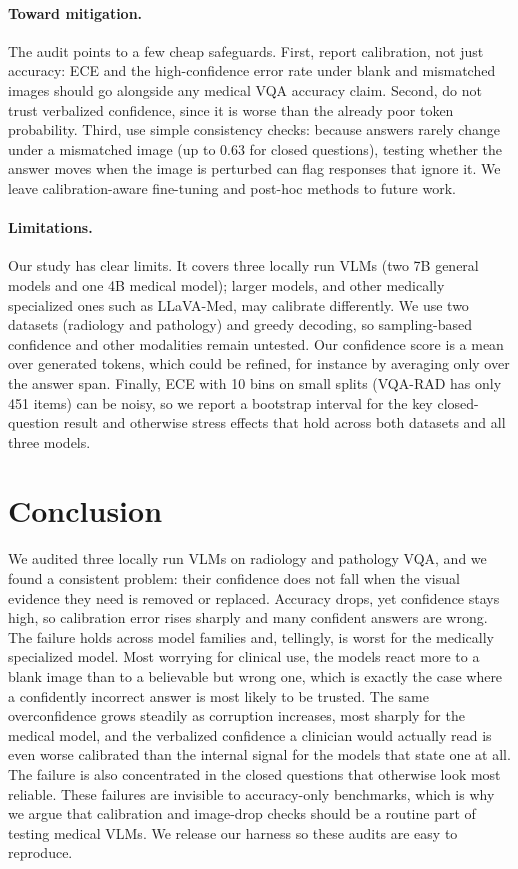 \documentclass{article}
\begin{document}
\paragraph{Toward mitigation.} The audit points to a few cheap safeguards. First,
report calibration, not just accuracy: ECE and the high-confidence error rate under
blank and mismatched images should go alongside any medical VQA accuracy claim.
Second, do not trust verbalized confidence, since it is worse than the already poor
token probability. Third, use simple consistency checks: because answers rarely
change under a mismatched image (up to $0.63$ for closed questions), testing whether
the answer moves when the image is perturbed can flag responses that ignore it. We
leave calibration-aware fine-tuning and post-hoc methods to future work.
\paragraph{Limitations.} Our study has clear limits. It covers three locally run VLMs (two
7B general models and one 4B medical model); larger models, and other
medically specialized ones such as LLaVA-Med, may calibrate differently. We use two
datasets (radiology
and pathology) and greedy decoding, so sampling-based confidence and other
modalities remain untested. Our confidence score is a mean over generated tokens,
which could be refined, for instance by averaging only over the answer span. Finally,
ECE with 10 bins on small splits (VQA-RAD has only 451
items) can be noisy, so we report a bootstrap interval for the key closed-question
result and otherwise stress effects that hold across both datasets and all three
models.

\section{Conclusion}
We audited three locally run VLMs on radiology and pathology VQA, and we found a
consistent problem: their confidence does not fall when the visual evidence they
need is removed or replaced. Accuracy drops, yet confidence stays high, so
calibration error rises sharply and many confident answers are wrong. The failure
holds across model families and, tellingly, is worst for the medically specialized
model. Most worrying for clinical use, the models react more to a blank image than
to a believable but wrong one, which is exactly the case where a confidently
incorrect answer is most likely to be trusted. The same overconfidence grows
steadily as corruption increases, most sharply for the medical model, and the
verbalized confidence a clinician would actually read is even worse calibrated than
the internal signal for the models that state one at all. The failure is also
concentrated in the closed questions that otherwise look most reliable. These failures are invisible to accuracy-only benchmarks, which is
why we argue that calibration and image-drop checks should be a routine part of
testing medical VLMs. We release our harness so these audits are easy to reproduce.




\newpage

\end{document}
